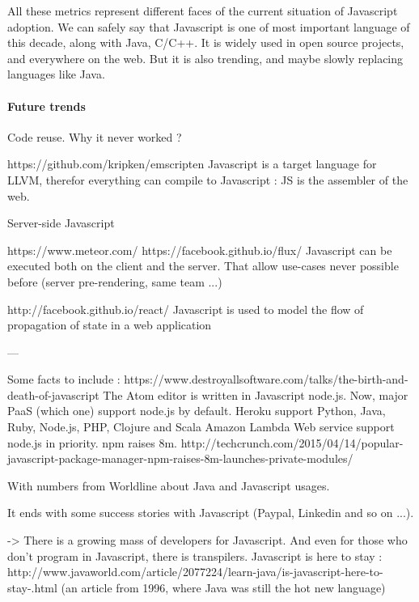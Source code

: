 All these metrics represent different faces of the current situation of Javascript adoption.
We can safely say that Javascript is one of most important language of this decade, along with Java, C/C++.
It is widely used in open source projects, and everywhere on the web.
But it is also trending, and maybe slowly replacing languages like Java.

\paragraph{Future trends}


Code reuse.
Why it never worked ?





https://github.com/kripken/emscripten
Javascript is a target language for LLVM, therefor everything can compile to Javascript : JS is the assembler of the web.


Server-side Javascript

https://www.meteor.com/
https://facebook.github.io/flux/
Javascript can be executed both on the client and the server.
That allow use-cases never possible before (server pre-rendering, same team ...)


http://facebook.github.io/react/
Javascript is used to model the flow of propagation of state in a web application



---

Some facts to include :
https://www.destroyallsoftware.com/talks/the-birth-and-death-of-javascript
The Atom editor is written in Javascript node.js.
Now, major PaaS (which one) support node.js by default.
Heroku support Python, Java, Ruby, Node.js, PHP, Clojure and Scala
Amazon Lambda Web service support node.js in priority.
npm raises 8m.
http://techcrunch.com/2015/04/14/popular-javascript-package-manager-npm-raises-8m-launches-private-modules/


With numbers from Worldline about Java and Javascript usages.

It ends with some success stories with Javascript (Paypal, Linkedin and so on ...).

-> There is a growing mass of developers for Javascript.
And even for those who don't program in Javascript, there is transpilers.
Javascript is here to stay : http://www.javaworld.com/article/2077224/learn-java/is-javascript-here-to-stay-.html (an article from 1996, where Java was still the hot new language)
